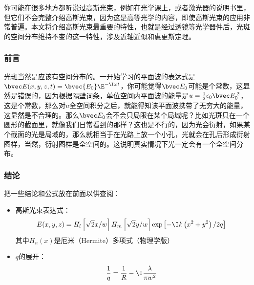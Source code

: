 

你可能在很多地方都听说过高斯光束，例如在光学课上，或者激光器的说明书里，但它们不会完整介绍高斯光束，因为这是高等光学的内容，即使高斯光束的应用非常普遍。本文将介绍高斯光束最重要的特性，也就是经过透镜等光学器件后，光斑的空间分布维持不变的这一特性，涉及近轴近似和惠更斯定理。%

\subsubsection{前言}
光斑当然是应该有空间分布的。一开始学习的平面波的表达式是$\bvec E(x,y,z,t)=\bvec {E_0}\E^{-\I\omega t}$，你可能觉得$\bvec E_0$可能是个常数，这显然是错误的，因为根据隔壁词条，单位空间内平面波的能量是$u=\frac{1}{2}\epsilon_0 \bvec E_0^{\;2}$，这是个常数，那么对$u$全空间积分之后，就能得知该平面波携带了无穷大的能量，这显然是不合理的。那么$\bvec E_0$会不会只局限在某个局域呢？比如光斑只在一个圆形的截面里，就像我们日常看到的那样？这也是不行的，因为光会衍射，如果某个截面的光是局域的，那么就相当于在光路上放一个小孔，光就会在孔后形成衍射图样，当然，衍射图样是全空间的。这说明真实情况下光一定会有一个全空间分布。
\subsubsection{结论}
把一些结论和公式放在前面以供查阅：
\begin{itemize}
\item 高斯光束表达式：
\begin{equation}
E(x,y,z)=H_l\left[\sqrt{2}x/w\right]H_m\left[\sqrt{2}y/w\right]\exp\left[-\I k\left(x^2+y^2\right)/2q\right]~
\end{equation}
其中$H_n(x)$是厄米（Hermite）多项式（物理学版）
\item $q$的展开：
\begin{equation}
\frac{1}{q}=\frac{1}{R}-\I\frac{\lambda}{\pi w^2}~
\end{equation}

\end{itemize}


